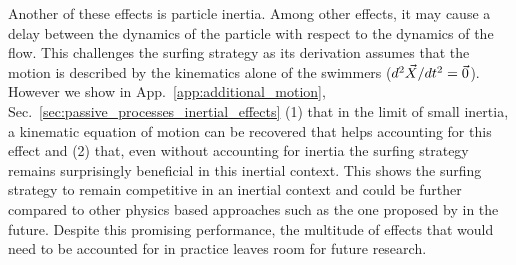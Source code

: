 Another of these effects is particle inertia.
Among other effects, it may cause a delay between the dynamics of the particle with respect to the dynamics of the flow.
This challenges the surfing strategy as its derivation assumes that the motion is described by the kinematics alone of the swimmers ($d^2 \vec{X} / dt^2 = \vec{0}$).
However we show in App.~\ref{app:additional_motion}, Sec.~\ref{sec:passive_processes_inertial_effects} (1) that in the limit of small inertia, a kinematic equation of motion can be recovered that helps accounting for this effect and (2) that, even without accounting for inertia the surfing strategy remains surprisingly beneficial in this inertial context.
This shows the surfing strategy to remain competitive in an inertial context and could be further compared to other physics based approaches such as the one proposed by \citet{bollt2021extract} in the future.
Despite this promising performance, the multitude of effects that would need to be accounted for in practice leaves room for future research.
